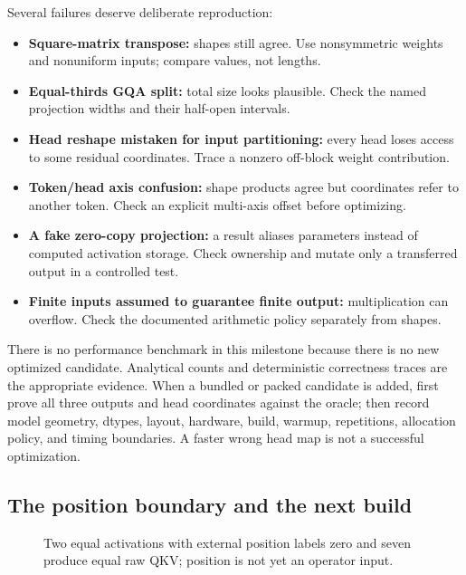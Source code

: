 \documentclass[
  10pt,
]{article}
\providecommand{\tightlist}{%
  \setlength{\itemsep}{0pt}\setlength{\parskip}{0pt}}
\begin{document}
Several failures deserve deliberate reproduction:

\begin{itemize}
\tightlist
\item
  \textbf{Square-matrix transpose:} shapes still agree. Use nonsymmetric
  weights and nonuniform inputs; compare values, not lengths.
\item
  \textbf{Equal-thirds GQA split:} total size looks plausible. Check the
  named projection widths and their half-open intervals.
\item
  \textbf{Head reshape mistaken for input partitioning:} every head
  loses access to some residual coordinates. Trace a nonzero off-block
  weight contribution.
\item
  \textbf{Token/head axis confusion:} shape products agree but
  coordinates refer to another token. Check an explicit multi-axis
  offset before optimizing.
\item
  \textbf{A fake zero-copy projection:} a result aliases parameters
  instead of computed activation storage. Check ownership and mutate
  only a transferred output in a controlled test.
\item
  \textbf{Finite inputs assumed to guarantee finite output:}
  multiplication can overflow. Check the documented arithmetic policy
  separately from shapes.
\end{itemize}

There is no performance benchmark in this milestone because there is no
new optimized candidate. Analytical counts and deterministic correctness
traces are the appropriate evidence. When a bundled or packed candidate
is added, first prove all three outputs and head coordinates against the
oracle; then record model geometry, dtypes, layout, hardware, build,
warmup, repetitions, allocation policy, and timing boundaries. A faster
wrong head map is not a successful optimization.

\subsection{The position boundary and the next
build}\label{the-position-boundary-and-the-next-build}

\begin{figure}[H]\centering\resizebox{\linewidth}{!}{}\caption{Two equal activations with external position labels zero and seven produce equal raw QKV; position is not yet an operator input.}\end{figure}
\end{document}
